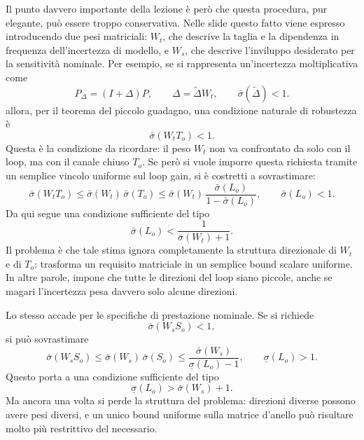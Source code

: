 \documentclass[11pt,a4paper]{article}
\begin{document}
Il punto davvero importante della lezione è però che questa procedura, pur elegante, può essere troppo conservativa. Nelle slide questo fatto viene espresso introducendo due pesi matriciali: $W_t$, che descrive la taglia e la dipendenza in frequenza dell'incertezza di modello, e $W_s$, che descrive l'inviluppo desiderato per la sensitività nominale. Per esempio, se si rappresenta un'incertezza moltiplicativa come
$$
P_\Delta = (I+\Delta)P,
\qquad
\Delta=\tilde{\Delta}W_t,
\qquad
\bar{\sigma}(\tilde{\Delta}) < 1.
$$
allora, per il teorema del piccolo guadagno, una condizione naturale di robustezza è
$$
\bar{\sigma}(W_t T_o) < 1.
$$
Questa è la condizione da ricordare: il peso $W_t$ non va confrontato da solo con il loop, ma con il canale chiuso $T_o$. Se però si vuole imporre questa richiesta tramite un semplice vincolo uniforme sul loop gain, si è costretti a sovrastimare:
$$
\bar{\sigma}(W_t T_o)
\le
\bar{\sigma}(W_t)\,\bar{\sigma}(T_o)
\le
\bar{\sigma}(W_t)\,\frac{\bar{\sigma}(L_o)}{1-\bar{\sigma}(L_o)},
\qquad
\bar{\sigma}(L_o)<1.
$$
Da qui segue una condizione sufficiente del tipo
$$
\bar{\sigma}(L_o) < \frac{1}{\bar{\sigma}(W_t)+1}.
$$
Il problema è che tale stima ignora completamente la struttura direzionale di $W_t$ e di $T_o$: trasforma un requisito matriciale in un semplice bound scalare uniforme. In altre parole, impone che tutte le direzioni del loop siano piccole, anche se magari l'incertezza pesa davvero solo alcune direzioni.

Lo stesso accade per le specifiche di prestazione nominale. Se si richiede
$$
\bar{\sigma}(W_s S_o)<1,
$$
si può sovrastimare
$$
\bar{\sigma}(W_s S_o)
\le
\bar{\sigma}(W_s)\,\bar{\sigma}(S_o)
\le
\frac{\bar{\sigma}(W_s)}{\underline{\sigma}(L_o)-1},
\qquad
\underline{\sigma}(L_o)>1.
$$
Questo porta a una condizione sufficiente del tipo
$$
\underline{\sigma}(L_o) > \bar{\sigma}(W_s)+1.
$$
Ma ancora una volta si perde la struttura del problema: direzioni diverse possono avere pesi diversi, e un unico bound uniforme sulla matrice d'anello può risultare molto più restrittivo del necessario.
\end{document}
